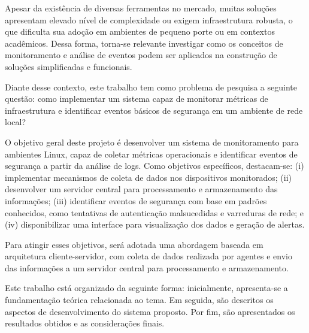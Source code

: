 \documentclass[
    12pt
    ,oneside
    ,a4paper
    ,chapter=TITLE
    ,section=TITLE
    ,sumario=abnt-6027-2012]{abntex2}
\begin{document}
Apesar da existência de diversas ferramentas no mercado, muitas soluções apresentam elevado nível de complexidade ou exigem infraestrutura robusta, o que dificulta sua adoção em ambientes de pequeno porte ou em contextos acadêmicos. Dessa forma, torna-se relevante investigar como os conceitos de monitoramento e análise de eventos podem ser aplicados na construção de soluções simplificadas e funcionais.

Diante desse contexto, este trabalho tem como problema de pesquisa a seguinte questão: como implementar um sistema capaz de monitorar métricas de infraestrutura e identificar eventos básicos de segurança em um ambiente de rede local?

O objetivo geral deste projeto é desenvolver um sistema de monitoramento para ambientes Linux, capaz de coletar métricas operacionais e identificar eventos de segurança a partir da análise de logs. Como objetivos específicos, destacam-se: (i) implementar mecanismos de coleta de dados nos dispositivos monitorados; (ii) desenvolver um servidor central para processamento e armazenamento das informações; (iii) identificar eventos de segurança com base em padrões conhecidos, como tentativas de autenticação malsucedidas e varreduras de rede; e (iv) disponibilizar uma interface para visualização dos dados e geração de alertas.

Para atingir esses objetivos, será adotada uma abordagem baseada em arquitetura cliente-servidor, com coleta de dados realizada por agentes e envio das informações a um servidor central para processamento e armazenamento.

Este trabalho está organizado da seguinte forma: inicialmente, apresenta-se a fundamentação teórica relacionada ao tema. Em seguida, são descritos os aspectos de desenvolvimento do sistema proposto. Por fim, são apresentados os resultados obtidos e as considerações finais.


\end{document}
